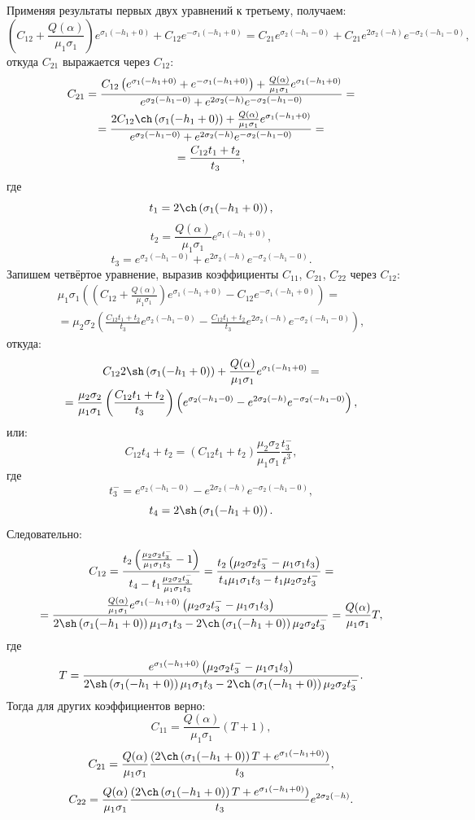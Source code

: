 \documentclass[a4paper, 12pt]{article}
\newcommand{\s}[1]{\sigma_{#1}}
\newcommand{\m}[1]{\mu_{#1}}
\newcommand{\E}[2]{e^{#1 #2}}
\begin{document}
Применяя результаты первых двух уравнений к третьему, получаем:
$$\left(C_{12}+\frac{Q(\alpha)}{\m{1} \s{1}} \right) \E{\s{1}}{(-h_1+0)}+ C_{12} \E{-\s{1}}{(-h_1+0)}=C_{21} \E{\s{2}}{(-h_1-0)}+ C_{21} \E{2\s{2}}{(-h)} \E{-\s{2}}{(-h_1-0)},$$
откуда $C_{21}$ выражается через $C_{12}$:
\begin{multline}
C_{21}=\frac{C_{12} \left(\E{\s{1}}{(-h_1+0)}+\E{-\s{1}}{(-h_1+0)}\right)+\frac{Q(\alpha)}{\m{1} \s{1}} \E{\s{1}}{(-h_1+0)}}{\E{\s{2}}{(-h_1-0)}+ \E{2\s{2}}{(-h)} \E{-\s{2}}{(-h_1-0)}}= \\
=\frac{2 C_{12} \ch \left(\s{1} (-h_1+0)\right)+\frac{Q(\alpha)}{\m{1} \s{1}} \E{\s{1}}{(-h_1+0)}}{\E{\s{2}}{(-h_1-0)}+ \E{2\s{2}}{(-h)} \E{-\s{2}}{(-h_1-0)}} =\\
=\frac{C_{12}t_1+t_2}{t_3},
\end{multline}
где
$$t_1=2\ch \left(\s{1} (-h_1+0) \right),$$
$$t_2=\frac{Q(\alpha)}{\m{1} \s{1}} \E{\s{1}}{(-h_1+0)},$$
$$t_3=\E{\s{2}}{(-h_1-0)}+ \E{2\s{2}}{(-h)} \E{-\s{2}}{(-h_1-0)} .$$
Запишем четвёртое уравнение, выразив коэффициенты $C_{11}$, $C_{21}$, $C_{22}$ через $C_{12}$:
\begin{multline}
\m{1}\s{1}\left(\left(C_{12}+\frac{Q(\alpha)}{\m{1} \s{1}}\right) \E{\s{1}}{(-h_1+0)}- C_{12} \E{-\s{1}}{(-h_1+0)}\right)= \\
=\m{2}\s{2}\left(\frac{C_{12}t_1+t_2}{t_3} \E{\s{2}}{(-h_1-0)}- \frac{C_{12}t_1+t_2}{t_3}\E{2\s{2}}{(-h)} \E{-\s{2}}{(-h_1-0)} \right),    
\end{multline}
откуда:
\begin{multline}
C_{12} 2 \sh \left(\s{1} (-h_1+0)\right)+ \frac{Q(\alpha)}{\m{1} \s{1}}\E{\s{1}}{(-h_1+0)}=\\
=\frac{\m{2}\s{2}}{\m{1}\s{1}} \left(\frac{C_{12}t_1+t_2}{t_3}\right)\left(\E{\s{2}}{(-h_1-0)}- \E{2\s{2}}{(-h)} \E{-\s{2}}{(-h_1-0)}\right),
\end{multline}
или:
$$C_{12} t_4+t_2=(C_{12} t_1 + t_2)\frac{\m{2}\s{2}}{\m{1}\s{1}} \frac{t_3^-}{t^3},$$
где
$$t_3^-=\E{\s{2}}{(-h_1-0)}- \E{2\s{2}}{(-h)} \E{-\s{2}}{(-h_1-0)},$$
$$t_4=2\sh \left( \s{1} (-h_1+0)\right).$$
Следовательно:
\begin{multline}
    C_{12}=\frac{t_2 \left( \frac{\m{2}\s{2}t_3^-}{\m{1}\s{1}t_3} -1\right)}{t_4-t_1 \frac{\m{2}\s{2}t_3^-}{\m{1}\s{1}t_3}} =\frac{t_2 \left( \m{2}\s{2}t_3^- - \m{1}\s{1}t_3\right)}{t_4 \m{1}\s{1}t_3 - t_1\m{2}\s{2}t_3^-}=\\
    =\frac{\frac{Q(\alpha)}{\m{1} \s{1}} \E{\s{1}}{(-h_1+0)}\left( \m{2}\s{2}t_3^- - \m{1}\s{1}t_3\right)}{2\sh \left( \s{1} (-h_1+0)\right)\m{1}\s{1}t_3 - 2\ch \left( \s{1} (-h_1+0)\right)\m{2}\s{2}t_3^-}=\frac{Q(\alpha)}{\m{1} \s{1}} T,
\end{multline}
где 
$$T=\frac{\E{\s{1}}{(-h_1+0)}\left( \m{2}\s{2}t_3^- - \m{1}\s{1}t_3\right)}{2\sh \left( \s{1} (-h_1+0)\right)\m{1}\s{1}t_3 - 2\ch \left( \s{1} (-h_1+0)\right)\m{2}\s{2}t_3^-}.$$
Тогда для других коэффициентов верно:
$$C_{11}=\frac{Q(\alpha)}{\m{1} \s{1}}(T+1),$$
$$C_{21}=\frac{Q(\alpha)}{\m{1} \s{1}}\frac{(2\ch \left(\s{1}(-h_1+0) \right)T+\E{\s{1}}{(-h_1+0)})}{t_3},$$
$$C_{22}=\frac{Q(\alpha)}{\m{1} \s{1}}\frac{(2\ch \left(\s{1}(-h_1+0) \right)T+\E{\s{1}}{(-h_1+0)})}{t_3}\E{2\s{2}}{(-h)} .$$
\end{document}
